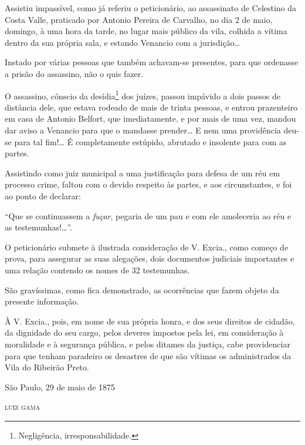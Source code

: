 Assistiu impassível, como já referiu o peticionário, ao assassinato de
Celestino da Costa Valle, praticado por Antonio Pereira de Carvalho, no
dia 2 de maio, domingo, à uma hora da tarde, no lugar mais público da
vila, colhida a vítima dentro da sua própria sala, e estando Venancio
com a jurisdição\ldots{}

Instado por várias pessoas que também achavam-se presentes, para que
ordenasse a prisão do assassino, não o quis fazer.

O assassino, cônscio da desídia\footnote{ Negligência,
  irresponsabilidade.} dos juízes, passou impávido a dois passos de
distância dele, que estava rodeado de mais de trinta pessoas, e entrou
prazenteiro em casa de Antonio Belfort, que imediatamente, e por mais de
uma vez, mandou dar aviso a Venancio para que o mandasse prender\ldots{} E
nem uma providência deu-se para tal fim!\ldots{} É completamente estúpido,
abrutado e insolente para com as partes.

Assistindo como juiz municipal a uma justificação para defesa de um réu
em processo crime, faltou com o devido respeito às partes, e aos
circunstantes, e foi ao ponto de declarar:

``Que se continuassem a \emph{fuçar}, pegaria de um pau e com ele
amoleceria ao réu e as testemunhas!\ldots{}''.

O peticionário submete à ilustrada consideração de V. Excia., como
começo de prova, para assegurar as suas alegações, dois documentos
judiciais importantes e uma relação contendo os nomes de 32 testemunhas.

São gravíssimas, como fica demonstrado, as ocorrências que fazem objeto
da presente informação.

À V. Excia., pois, em nome de sua própria honra, e dos seus direitos de
cidadão, da dignidade do seu cargo, pelos deveres impostos pela lei, em
consideração à moralidade e à segurança pública, e pelos ditames da
justiça, cabe providenciar para que tenham paradeiro os desastres de que
são vítimas os administrados da Vila do Ribeirão Preto.

\begin{flushright}
São Paulo, 29 de maio de 1875

\textsc{luiz gama}
\end{flushright}

\asterisc{}
